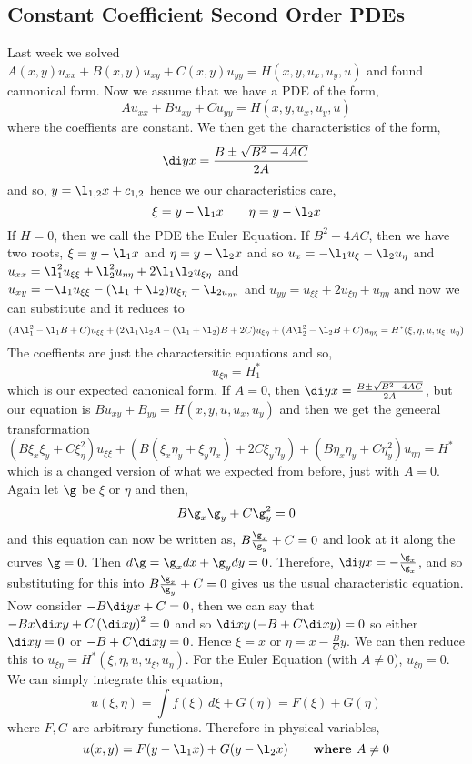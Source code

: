 
\subsection{Constant Coefficient Second Order PDEs}

Last week we solved $A(x, y)u_{xx} + B(x, y)u_{xy} + C(x,y)u_{yy} = H(x, y, u_x, u_y, u)$ and found cannonical form. Now we assume that we have a PDE of the form,
$$ Au_{xx} + Bu_{xy} + Cu_{yy} = H(x, y, u_x, u_y, u) $$
where the coeffients are constant. We then get the characteristics of the form,
$$ \di y x = \frac{B \pm \sqrt{B^2 - 4AC}}{2A} $$
and so,
$y = \l_{1, 2}x + c_{1, 2}$
hence we our characteristics care,
$$ \xi = y - \l_1x \qquad \eta = y - \l_2x $$
If $H = 0$, then we call the PDE the Euler Equation. If $B^2 - 4AC$, then we have two roots, $\xi = y - \l_1x$ and $\eta = y - \l_2x$ and so $u_{x} = -\l_1u_\xi - \l_2u_\eta$ and $u_{xx} = \l_1^2u_{\xi\xi} + \l_2^2u_{\eta\eta} + 2\l_1\l_2u_{\xi\eta}$ and $u_{xy} = -\l_1u_{\xi\xi} - (\l_1 + \l_2)u_{\xi\eta} - \l_{2u_{\eta\eta}}$ and $u_{yy} = u_{\xi\xi} + 2u_{\xi\eta} + u_{\eta\eta}$ and now we can substitute and it reduces to
$$ (A\l_1^2 - \l_1B + C)u_{\xi\xi} + (2\l_1\l_2 A - (\l_1 + \l_2)B + 2C)u_{\xi\eta} + (A\l_2^2 - \l_2B + C)u_{\eta\eta} = H^*(\xi,\eta, u, u_\xi, u_\eta) $$
The coeffients are just the charactersitic equations and so,
$$ u_{\xi\eta} = H^*_1 $$
which is our expected canonical form. If $A = 0$, then $\di y x = \frac{B \pm \sqrt{B^2 - 4AC}}{2A}$, but our equation is $Bu_{xy} + B_{yy} = H(x, y, u, u_x, u_y)$ and then we get the geneeral transformation $(B\xi_x\xi_y + C\xi_\eta^2)u_{\xi\xi} + (B(\xi_x\eta_y + \xi_y\eta_x) + 2C\xi_y\eta_y) + (B\eta_x\eta_y + C\eta_y^2)u_{\eta\eta} = H^*$
which is a changed version of what we expected from before, just with $A = 0$. Again let $\g$ be $\xi$ or $\eta$ and then,
$$ B\g_x\g_y + C\g_y^2 = 0 $$
and this equation can now be written as, $B \frac{\g_x}{\g_y} + C = 0$ and look at it along the curves $\g =0$. Then $d\g = \g_xdx + \g_ydy = 0$. Therefore, $\di y x = -\frac{\g_x}{\g_x}$, and so substituting for this into $B\frac{\g_x}{\g_y} + C = 0$ gives us the usual characteristic equation.\\

\noindent
Now consider $-B\di y x + C = 0$, then we can say that $-Bx\di x y + C\left(\di x y\right)^2 = 0$ and so $\di x y\left( -B + C\di x y \right) = 0$ so either $\di x y = 0$ or $-B + C\di x y = 0$. Hence $\xi = x$ or $\eta = x - \frac{B}{C}y$. We can then reduce this to $u_{\xi\eta} = H^*(\xi, \eta, u, u_\xi, u_\eta)$. For the Euler Equation (with $A \ne 0$), $u_{\xi\eta} = 0$.
We can simply integrate this equation,
$$ u(\xi, \eta) = \int f(\xi)\,d\xi + G(\eta) = F(\xi) + G(\eta)$$
where $F, G$ are arbitrary functions. Therefore in physical variables,
$$ u(x, y) = F(y - \l_1x) + G(y - \l_2x) \qquad \text{\textbf{where $A \ne 0$}}$$

